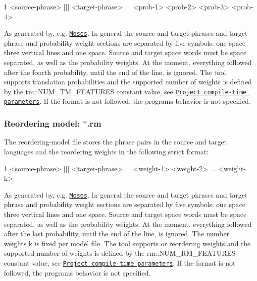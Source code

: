 \begin{DoxyCode}
1 <source-phrase> ||| <target-phrase> ||| <prob-1> <prob-2> <prob-3> <prob-4>
\end{DoxyCode}


As generated by, e.\+g. \href{http://www.statmt.org/moses/?n=Moses.Tutorial}{\tt Moses}. In general the source and target phrases and target phrase and probability weight sections are separated by five symbols\+: one space three vertical lines and one space. Source and target space words must be space separated, as well as the probability weights. At the moment, everything followed after the fourth probability, until the end of the line, is ignored. The tool supports {} translation probabilities and the supported number of weights is defined by the {\ttfamily tm\+::\+N\+U\+M\+\_\+\+T\+M\+\_\+\+F\+E\+A\+T\+U\+R\+E\+S} constant value, see \href{#project-compile-time-parameters}{\tt Project compile-\/time parameters}. If the format is not followed, the program\textquotesingle{}s behavior is not specified.

\subsubsection*{Reordering model\+: {\ttfamily $\ast$.rm}}

The reordering-\/model file stores the phrase pairs in the source and target languages and the reordering weights in the following strict format\+:


\begin{DoxyCode}
1 <source-phrase> ||| <target-phrase> ||| <weight-1> <weight-2> ... <weight-k>
\end{DoxyCode}


As generated by, e.\+g. \href{http://www.statmt.org/moses/?n=FactoredTraining.BuildReorderingModel}{\tt Moses}. In general the source and target phrases and target phrase and probability weight sections are separated by five symbols\+: one space three vertical lines and one space. Source and target space words must be space separated, as well as the probability weights. At the moment, everything followed after the last probability, until the end of the line, is ignored. The number weights {\ttfamily k} is fixed per model file. The tool supports {} or {} reordering weights and the supported number of weights is defined by the {\ttfamily rm\+::\+N\+U\+M\+\_\+\+R\+M\+\_\+\+F\+E\+A\+T\+U\+R\+E\+S} constant value, see \href{#project-compile-time-parameters}{\tt Project compile-\/time parameters}. If the format is not followed, the program\textquotesingle{}s behavior is not specified.

